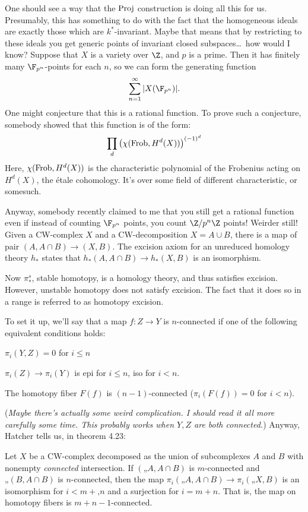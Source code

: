 \documentclass[11pt]{article}
\begin{document}
One should see a way that the $\operatorname{Proj}$ construction is doing all this for us.
Presumably, this has something to do with the fact that the homogeneous ideals
are exactly those which are $k^*$-invariant. Maybe that means that by
restricting to these ideals you get generic points of invariant closed
subspaces\ldots\ how would I know?
Suppose that $X$ is a variety over $\Z$, and $p$ is a prime. Then it has
finitely many $\F_{p^n}$-points for each $n$, so we can form the generating
function
\[\sum_{n=1}^\infty|X(\F_{p^n})|.\]
One might conjecture that this is a rational function. To prove such a
conjecture, somebody showed that this function is of the form:
\[\prod_{d}\left(\chi(\operatorname{Frob},H^d(X))\right)^{(-1)^d}\]
Here, $\chi(\operatorname{Frob},H^d(X))$ is the characteristic polynomial of the Frobenius
acting on $H^d(X)$, the \'etale cohomology. It's over some field of different
characteristic, or somesuch.

Anyway, somebody recently claimed to me that you still get a rational function
even if instead of counting $\F_{p^n}$ points, you count $\Z/p^n\Z$ points!
Weirder still!
Given a CW-complex $X$ and a CW-decomposition $X=A\cup B$, there is a map of
pair $(A,A\cap B)\to (X,B)$. The excision axiom for an unreduced homology theory
$h_*$ states that $h_*(A,A\cap B)\to h_*(X,B)$ is an isomorphism.

Now $\pi_*^s$, stable homotopy, is a homology theory, and thus satisfies
excision. However, unstable homotopy does not satisfy excision. The fact that it
does so in a range is referred to as homotopy excision.

To set it up, we'll say that a map $f:Z\to Y$ is $n$-connected if one of the
following equivalent conditions holds:
\begin{itemise}
\item $\pi_i(Y,Z)=0$ for $i\leq n$
\item $\pi_i(Z)\to\pi_i(Y)$ is epi for $i\leq n$, iso for $i<n$.
\item The homotopy fiber $F(f)$ is $(n-1)$-connected ($\pi_i(F(f))=0$ for
$i<n$).
\end{itemise}
{\small (\emph{Maybe there's actually some weird complication. I should read it
all more carefully some time. This probably works when $Y,Z$ are both
connected.})} Anyway, Hatcher tells us, in theorem 4.23:
\begin{thm*}Let $X$ be a CW-complex decomposed as the union of subcomplexes $A$
and $B$ with nonempty \emph{connected} intersection. If $(A,A\cap B)$ is
$m$-connected and $(B,A\cap B)$ is $n$-connected, then the map
$\pi_i(A,A\cap B)\to\pi_i(X,B)$ is an isomorphism for $i<m+n$ and a
surjection for $i= m+n$. That is, the map on homotopy fibers is
$m+n-1$-connected.
\end{thm*}
\end{document}
